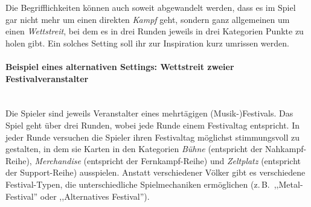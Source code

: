 \documentclass[a4paper,11pt]{report}
\begin{document}
Die Begrifflichkeiten können auch soweit abgewandelt werden, dass es im Spiel gar nicht mehr um einen direkten \emph{Kampf} geht, sondern ganz allgemeinen um einen \emph{Wettstreit}, bei dem es in drei Runden jeweils in drei Kategorien Punkte zu holen gibt. Ein solches Setting soll ihr zur Inspiration kurz umrissen werden.

\paragraph{Beispiel eines alternativen Settings: Wettstreit zweier Festivalveranstalter}~\\
Die Spieler sind jeweils Veranstalter eines mehrtägigen (Musik-)Festivals. Das Spiel geht über drei Runden, wobei jede Runde einem Festivaltag entspricht. In jeder Runde versuchen die Spieler ihren Festivaltag möglichst stimmungsvoll zu gestalten, in dem sie Karten in den Kategorien \emph{Bühne} (entspricht der Nahkampf-Reihe), \emph{Merchandise} (entspricht der Fernkampf-Reihe) und \emph{Zeltplatz} (entspricht der Support-Reihe) ausspielen. Anstatt verschiedener Völker gibt es verschiedene Festival-Typen, die unterschiedliche Spielmechaniken ermöglichen (z.\,B.\ ,,Metal-Festival'' oder ,,Alternatives Festival'').
\end{document}
